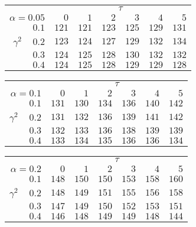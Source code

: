 \begin{tabular}{r|rrrrrr}
\hline\hline
 &\multicolumn{6}{c}{$\tau$} \\ 
 $\alpha = 0.05$ & $0$ & $1$ & $2$ & $3$ & $4$ & $5$ \\ 
 \hline$0.1$ & $121$ & $121$ & $123$ & $125$ & $129$ & $131$\\ 
$\gamma^2\;\;\;$ $0.2$ & $123$ & $124$ & $127$ & $129$ & $132$ & $134$\\ 
$0.3$ & $124$ & $125$ & $128$ & $130$ & $132$ & $132$\\ 
$0.4$ & $124$ & $125$ & $128$ & $129$ & $129$ & $128$\\ 
 \hline 
 \end{tabular}
 
 \vspace{2em} 
 
\begin{tabular}{r|rrrrrr}
\hline\hline
 &\multicolumn{6}{c}{$\tau$} \\ 
 $\alpha = 0.1$ & $0$ & $1$ & $2$ & $3$ & $4$ & $5$ \\ 
 \hline$0.1$ & $131$ & $130$ & $134$ & $136$ & $140$ & $142$\\ 
$\gamma^2\;\;\;$ $0.2$ & $131$ & $132$ & $136$ & $139$ & $141$ & $142$\\ 
$0.3$ & $132$ & $133$ & $136$ & $138$ & $139$ & $139$\\ 
$0.4$ & $133$ & $134$ & $135$ & $136$ & $136$ & $134$\\ 
 \hline 
 \end{tabular}
 
 \vspace{2em} 
 
\begin{tabular}{r|rrrrrr}
\hline\hline
 &\multicolumn{6}{c}{$\tau$} \\ 
 $\alpha = 0.2$ & $0$ & $1$ & $2$ & $3$ & $4$ & $5$ \\ 
 \hline$0.1$ & $148$ & $150$ & $150$ & $153$ & $158$ & $160$\\ 
$\gamma^2\;\;\;$ $0.2$ & $148$ & $149$ & $151$ & $155$ & $156$ & $158$\\ 
$0.3$ & $147$ & $149$ & $150$ & $152$ & $153$ & $151$\\ 
$0.4$ & $146$ & $148$ & $149$ & $149$ & $148$ & $144$\\ 
 \hline 
 \end{tabular}
